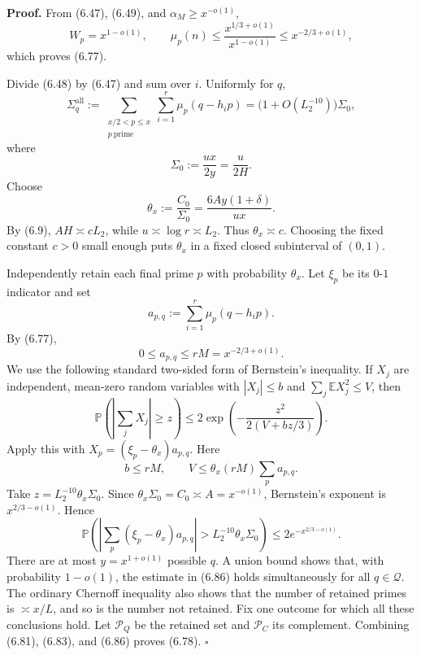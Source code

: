 \documentclass[10pt,letterpaper]{article}
\newcommand{\PP}{\mathbb{P}}
\newcommand{\EE}{\mathbb{E}}
\newcommand{\PC}{\mathcal{P}_C}
\newcommand{\PQ}{\mathcal{P}_Q}
\newcommand{\QQ}{\mathcal{Q}}
\newcommand{\qedmark}{\(\square\)}
\begin{document}
\textbf{Proof.} From (6.47), (6.49), and $\alpha_M\ge x^{-o(1)}$,
\[
W_p=x^{1-o(1)},\qquad\mu_p(n)\le\frac{x^{1/3+o(1)}}{x^{1-o(1)}}\le x^{-2/3+o(1)},
\]
which proves (6.77).

Divide (6.48) by (6.47) and sum over $i$. Uniformly for $q$,
\begin{equation}
\Sigma_q^{\mathrm{all}}:=\sum_{\substack{x/2<p\le x\\p\ \mathrm{prime}}}\sum_{i=1}^r\mu_p(q-h_ip)
=\bigl(1+O(L_2^{-10})\bigr)\Sigma_0,
\tag{6.81}
\end{equation}
where
\begin{equation}
\Sigma_0:=\frac{ux}{2y}=\frac u{2H}.
\tag{6.82}
\end{equation}
Choose
\begin{equation}
\theta_x:=\frac{C_0}{\Sigma_0}=\frac{6Ay(1+\delta)}{ux}.
\tag{6.83}
\end{equation}
By (6.9), $AH\asymp cL_2$, while $u\asymp\log r\asymp L_2$. Thus $\theta_x\asymp c$. Choosing the fixed constant $c>0$ small enough
puts $\theta_x$ in a fixed closed subinterval of $(0,1)$.

Independently retain each final prime $p$ with probability $\theta_x$. Let $\xi_p$ be its $0$-$1$ indicator and set
\[
a_{p,q}:=\sum_{i=1}^r\mu_p(q-h_ip).
\]
By (6.77),
\begin{equation}
0\le a_{p,q}\le rM=x^{-2/3+o(1)}.
\tag{6.84}
\end{equation}
We use the following standard two-sided form of Bernstein's inequality. If $X_j$ are independent, mean-zero
random variables with $|X_j|\le b$ and $\sum_j\EE X_j^2\le V$, then
\begin{equation}
\PP\left(\left|\sum_jX_j\right|\ge z\right)
\le2\exp\left(-\frac{z^2}{2(V+bz/3)}\right).
\tag{6.85}
\end{equation}
Apply this with $X_p=(\xi_p-\theta_x)a_{p,q}$. Here
\[
b\le rM,\qquad V\le\theta_x(rM)\sum_p a_{p,q}.
\]
Take $z=L_2^{-10}\theta_x\Sigma_0$. Since $\theta_x\Sigma_0=C_0\asymp A=x^{-o(1)}$, Bernstein's exponent is $x^{2/3-o(1)}$. Hence
\begin{equation}
\PP\left(\left|\sum_p(\xi_p-\theta_x)a_{p,q}\right|>L_2^{-10}\theta_x\Sigma_0\right)
\le2e^{-x^{2/3-o(1)}}.
\tag{6.86}
\end{equation}
There are at most $y=x^{1+o(1)}$ possible $q$. A union bound shows that, with probability $1-o(1)$, the estimate
in (6.86) holds simultaneously for all $q\in\QQ$. The ordinary Chernoff inequality also shows that the number of
retained primes is $\asymp x/L$, and so is the number not retained. Fix one outcome for which all these conclusions
hold. Let $\PQ$ be the retained set and $\PC$ its complement. Combining (6.81), (6.83), and (6.86) proves (6.78). \qedmark
\end{document}
